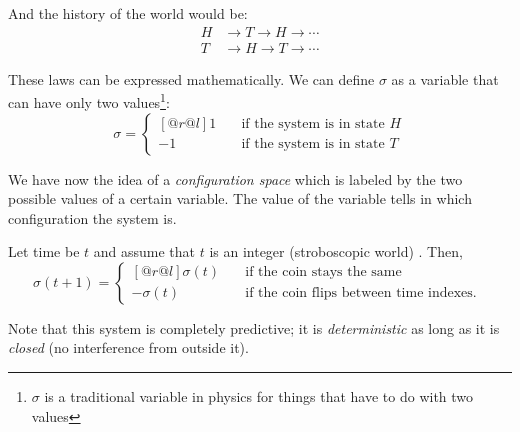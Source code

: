 \documentclass[pagesize,headsepline,10pt,parskip=half]{scrreprt}
\begin{document}
        And the history of the world would be:
        \begin{align*}
          H &\rightarrow T \rightarrow H \rightarrow \cdots \\
          T &\rightarrow H \rightarrow T \rightarrow \cdots
        \end{align*}

        These laws can be expressed mathematically.  We can define $\sigma$ as a
        variable that can have only two values\footnote{$\sigma$ is a
        traditional variable in physics for things that have to do with two
        values}:
        \[ \sigma =  \begin{cases}[@{}r@{}l]
             1 & \quad \textrm{if the system is in state } H \\
            -1 & \quad \textrm{if the system is in state } T
          \end{cases} \]
        \begin{center}
        \end{center}

        We have now the idea of a \emph{configuration space} which
        is labeled by the two possible values of a certain
        variable.  The value of the variable tells in which
        configuration the system is.

        Let time be $t$ and assume that $t$ is an integer (stroboscopic
        world) . Then,
        \[ \sigma(t + 1) = \begin{cases}[@{}r@{}l]
            \sigma(t)  & \quad \textrm{if the coin stays the same} \\
            -\sigma(t) & \quad \textrm{if the coin flips between time indexes. }
          \end{cases} \]

        Note that this system is completely predictive; it is
        \emph{deterministic} as long as it is \emph{closed}
        (no interference from outside it).
\end{document}
